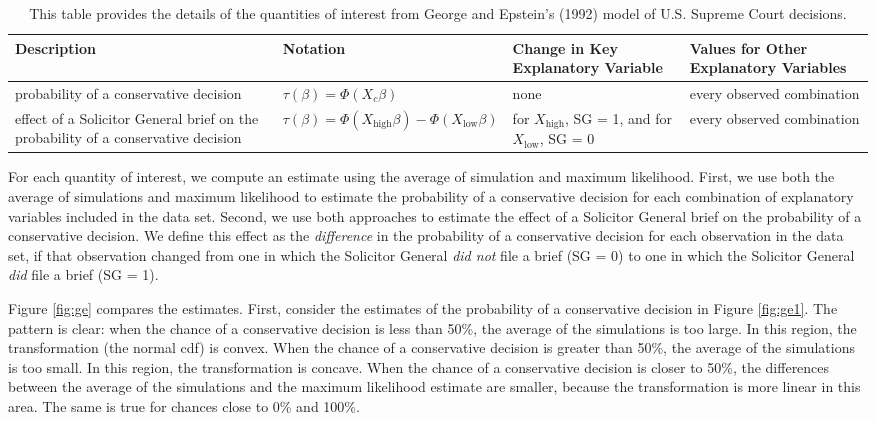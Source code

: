 \documentclass[10pt]{article}
\begin{document}
\begin{table}[h!]
\centering
\caption{This table provides the details of the quantities of interest from George and Epstein's (1992) model of U.S. Supreme Court decisions.}
\label{tab:ge-qi}
\footnotesize
\begin{tabular}{@{} m{5cm} m{4cm} m{2.5cm}m{4cm}@{}}
\toprule
Description                                                                       & Notation                                                  & Change in Key Explanatory Variable               & Values for Other Explanatory Variables \\ \midrule
probability of a conservative decision                                            & $\tau(\beta) = \Phi(X_c \beta)$                           & none                                             & every observed combination   \\\hline
effect of a Solicitor General brief on the probability of a conservative decision & $\tau(\beta) = \Phi(X_\text{high} \beta) - \Phi(X_\text{low}\beta)$ & for $X_\text{high}$, SG = 1, and for $X_\text{low}$, SG = 0 & every observed combination   \\ \bottomrule
\end{tabular}
\end{table}

For each quantity of interest, we compute an estimate using the average of simulation and maximum likelihood.
First, we use both the average of simulations and maximum likelihood to estimate the probability of a conservative decision for each combination of explanatory variables included in the data set. 
Second, we use both approaches to estimate the effect of a Solicitor General brief on the probability of a conservative decision. 
We define this effect as the \textit{difference} in the probability of a conservative decision for each observation in the data set, if that observation changed from one in which the Solicitor General \emph{did not} file a brief (SG = 0) to one in which the Solicitor General \emph{did} file a brief (SG = 1).

Figure \ref{fig:ge} compares the estimates. 
First, consider the estimates of the probability of a conservative decision in Figure \ref{fig:ge1}.
The pattern is clear: when the chance of a conservative decision is less than 50\%, the average of the simulations is too large. 
In this region, the transformation (the normal cdf) is convex. 
When the chance of a conservative decision is greater than 50\%, the average of the simulations is too small. 
In this region, the transformation is concave. 
When the chance of a conservative decision is closer to 50\%, the differences between the average of the simulations and the maximum likelihood estimate are smaller, because the transformation is more linear in this area. 
The same is true for chances close to 0\% and 100\%.
\end{document}
